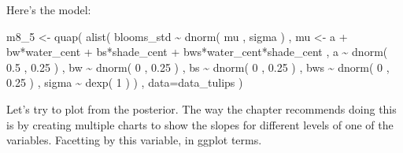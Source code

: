 \documentclass[
]{book}
\newenvironment{Shaded}{\begin{snugshade}}{\end{snugshade}}
\newcommand{\AttributeTok}[1]{\textcolor[rgb]{0.77,0.63,0.00}{#1}}
\newcommand{\DecValTok}[1]{\textcolor[rgb]{0.00,0.00,0.81}{#1}}
\newcommand{\FloatTok}[1]{\textcolor[rgb]{0.00,0.00,0.81}{#1}}
\newcommand{\FunctionTok}[1]{\textcolor[rgb]{0.00,0.00,0.00}{#1}}
\newcommand{\NormalTok}[1]{#1}
\newcommand{\OtherTok}[1]{\textcolor[rgb]{0.56,0.35,0.01}{#1}}
\newcommand{\SpecialCharTok}[1]{\textcolor[rgb]{0.00,0.00,0.00}{#1}}
\begin{document}
Here's the model:

\begin{Shaded}
\begin{Highlighting}[]
\NormalTok{m8\_5 }\OtherTok{\textless{}{-}} \FunctionTok{quap}\NormalTok{( }\FunctionTok{alist}\NormalTok{(}
\NormalTok{blooms\_std }\SpecialCharTok{\textasciitilde{}} \FunctionTok{dnorm}\NormalTok{( mu , sigma ) , }
\NormalTok{mu }\OtherTok{\textless{}{-}}\NormalTok{ a }\SpecialCharTok{+}\NormalTok{ bw}\SpecialCharTok{*}\NormalTok{water\_cent }\SpecialCharTok{+}\NormalTok{ bs}\SpecialCharTok{*}\NormalTok{shade\_cent }\SpecialCharTok{+}\NormalTok{ bws}\SpecialCharTok{*}\NormalTok{water\_cent}\SpecialCharTok{*}\NormalTok{shade\_cent , }
\NormalTok{a }\SpecialCharTok{\textasciitilde{}} \FunctionTok{dnorm}\NormalTok{( }\FloatTok{0.5}\NormalTok{ , }\FloatTok{0.25}\NormalTok{ ) , }
\NormalTok{bw }\SpecialCharTok{\textasciitilde{}} \FunctionTok{dnorm}\NormalTok{( }\DecValTok{0}\NormalTok{ , }\FloatTok{0.25}\NormalTok{ ) , }
\NormalTok{bs }\SpecialCharTok{\textasciitilde{}} \FunctionTok{dnorm}\NormalTok{( }\DecValTok{0}\NormalTok{ , }\FloatTok{0.25}\NormalTok{ ) , }
\NormalTok{bws }\SpecialCharTok{\textasciitilde{}} \FunctionTok{dnorm}\NormalTok{( }\DecValTok{0}\NormalTok{ , }\FloatTok{0.25}\NormalTok{ ) , }
\NormalTok{sigma }\SpecialCharTok{\textasciitilde{}} \FunctionTok{dexp}\NormalTok{( }\DecValTok{1}\NormalTok{ )}
\NormalTok{) , }\AttributeTok{data=}\NormalTok{data\_tulips )}
\end{Highlighting}
\end{Shaded}

Let's try to plot from the posterior. The way the chapter recommends doing this is by creating multiple charts to show the slopes for different levels of one of the variables. Facetting by this variable, in ggplot terms.
\end{document}

